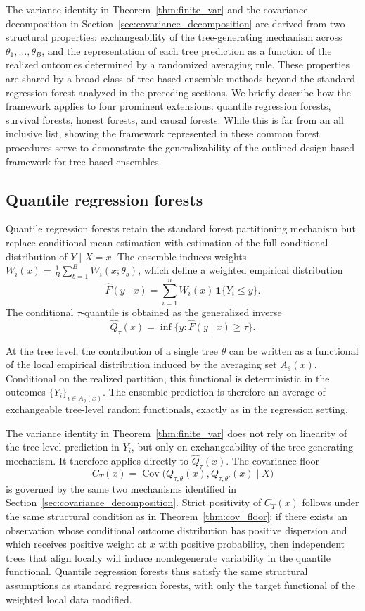 \documentclass[11pt]{article}
\theoremstyle{plain}
\theoremstyle{definition}
\theoremstyle{remark}
\DeclareMathOperator{\Cov}{Cov}
\begin{document}
The variance identity in Theorem~\ref{thm:finite_var} and the covariance decomposition in Section~\ref{sec:covariance_decomposition} are derived from two structural properties: exchangeability of the tree-generating mechanism across $\theta_1,\ldots,\theta_B$, and the representation of each tree prediction as a function of the realized outcomes determined by a randomized averaging rule. These properties are shared by a broad class of tree-based ensemble methods beyond the standard regression forest analyzed in the preceding sections. We briefly describe how the framework applies to four prominent extensions: quantile regression forests, survival forests, honest forests, and causal forests. While this is far from an all inclusive list, showing the framework represented in these common forest procedures serve to demonstrate the generalizability of the outlined design-based framework for tree-based ensembles. 

\subsection{Quantile regression forests}
\label{subsec:qrf}

Quantile regression forests \citep{meinshausen2006} retain the standard forest partitioning mechanism but replace conditional mean estimation with estimation of the full conditional distribution of $Y \mid X = x$. The ensemble induces weights $W_i(x) = \frac{1}{B}\sum_{b=1}^B W_i(x;\theta_b)$, which define a weighted empirical distribution
\[
\hat F(y \mid x)
=
\sum_{i=1}^n W_i(x)\,\mathbf{1}\{Y_i \le y\}.
\]
The conditional $\tau$-quantile is obtained as the generalized inverse
\[
\hat Q_\tau(x) = \inf\{ y : \hat F(y \mid x) \ge \tau \}.
\]

At the tree level, the contribution of a single tree $\theta$ can be written as a functional of the local empirical distribution induced by the averaging set $A_\theta(x)$. Conditional on the realized partition, this functional is deterministic in the outcomes $\{Y_i\}_{i \in A_\theta(x)}$. The ensemble prediction is therefore an average of exchangeable tree-level random functionals, exactly as in the regression setting.

The variance identity in Theorem~\ref{thm:finite_var} does not rely on linearity of the tree-level prediction in $Y_i$, but only on exchangeability of the tree-generating mechanism. It therefore applies directly to $\hat Q_\tau(x)$. The covariance floor
\[
C_T(x) = \Cov\!\bigl(Q_{\tau,\theta}(x), Q_{\tau,\theta'}(x) \mid X\bigr)
\]
is governed by the same two mechanisms identified in Section~\ref{sec:covariance_decomposition}. Strict positivity of $C_T(x)$ follows under the same structural condition as in Theorem~\ref{thm:cov_floor}: if there exists an observation whose conditional outcome distribution has positive dispersion and which receives positive weight at $x$ with positive probability, then independent trees that align locally will induce nondegenerate variability in the quantile functional. Quantile regression forests thus satisfy the same structural assumptions as standard regression forests, with only the target functional of the weighted local data modified.
\end{document}
